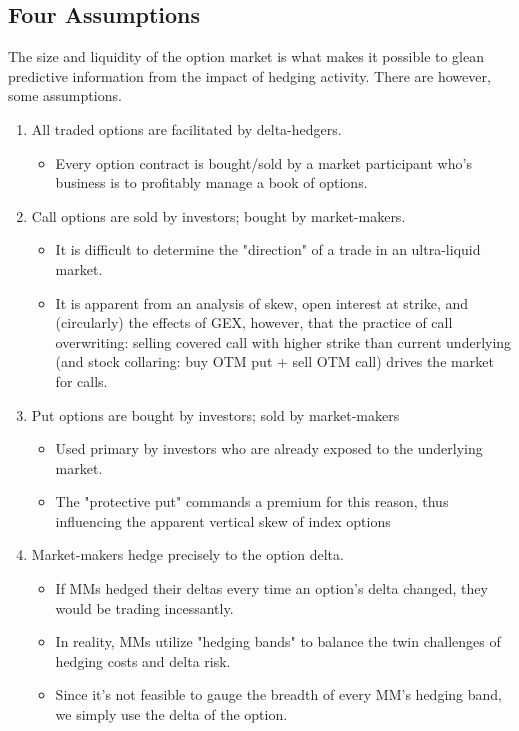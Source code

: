 \documentclass[12pt, oneside]{article}
\begin{document}
\subsection{Four Assumptions}
The size and liquidity of the option market is what makes it possible to glean predictive information from the impact of hedging activity. There are however, some assumptions. 
\begin{enumerate}
    \item All traded options are facilitated by delta-hedgers. 
    \begin{itemize}
        \item Every option contract is bought/sold by a market participant who's business is to profitably manage a book of options.
    \end{itemize}
    \item Call options are sold by investors; bought by market-makers. 
    \begin{itemize}
        \item It is difficult to determine the "direction" of a trade in an ultra-liquid market.
        \item It is apparent from an analysis of skew, open interest at strike, and (circularly) the effects of GEX, however, that the practice of call overwriting: selling covered call with higher strike than current underlying (and stock collaring: buy OTM put + sell OTM call) drives the market for calls.
    \end{itemize}
    \item Put options are bought by investors; sold by market-makers
    \begin{itemize}
        \item Used primary by investors who are already exposed to the underlying market.
        \item The "protective put" commands a premium for this reason, thus influencing the apparent vertical skew of index options
    \end{itemize}
    \item Market-makers hedge precisely to the option delta. 
    \begin{itemize}
        \item If MMs hedged their deltas every time an option's delta changed, they would be trading incessantly.
        \item In reality, MMs utilize "hedging bands" to balance the twin challenges of hedging costs and delta risk.
        \item Since it's not feasible to gauge the breadth of every MM's hedging band, we simply use the delta of the option.
    \end{itemize}
\end{enumerate}
\end{document}
